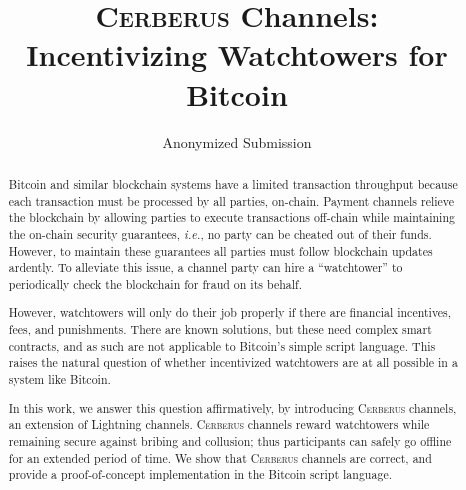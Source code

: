 \documentclass[twocolumn,showpacs,%
  nofootinbib,aps,superscriptaddress,%
  eqsecnum,prd,notitlepage,showkeys,10pt]{revtex4-1}
\newcommand{\ie}{{\em i.e.}}
\newcommand{\sys}{\textsc{Cerberus}\xspace}
\begin{document}
\title{\sys Channels: \\ Incentivizing Watchtowers for Bitcoin}
%
\author{Anonymized Submission}
%
%
%


%
%
\begin{abstract}
Bitcoin and similar blockchain systems have a limited transaction throughput because each transaction must be processed by all parties, on-chain.
Payment channels relieve the blockchain by allowing parties to execute transactions off-chain while maintaining the on-chain security guarantees, \ie, no party can be cheated out of their funds. However, to maintain these guarantees all parties must follow blockchain updates ardently.
To alleviate this issue, a channel party can hire a ``watchtower'' to periodically check the blockchain for fraud on its behalf.

However, watchtowers will only do their job properly if there are financial incentives, fees, and punishments. There are known solutions, but these need complex smart contracts, and as such are not applicable to Bitcoin's simple script language. This raises the natural question of whether incentivized watchtowers are at all possible in a system like Bitcoin.

In this work, we answer this question affirmatively, by introducing \sys channels, an extension of Lightning channels. \sys channels reward watchtowers while remaining secure against bribing and collusion; thus participants can safely go offline for an extended period of time.
We show that \sys channels are correct, and provide a proof-of-concept implementation in the Bitcoin script language.

\end{abstract}

\maketitle
\end{document}
